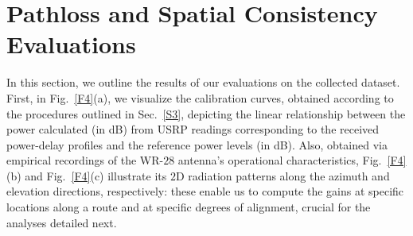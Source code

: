 \documentclass[12pt, draftcls, onecolumn]{IEEEtran}
\begin{document}
\section{Pathloss and Spatial Consistency Evaluations}\label{S4}
In this section, we outline the results of our evaluations on the collected dataset. First, in Fig.~\ref{F4}(a), we visualize the calibration curves, obtained according to the procedures outlined in Sec.~\ref{S3}, depicting the linear relationship between the power calculated (in dB) from USRP readings corresponding to the received power-delay profiles and the reference power levels (in dB). Also, obtained via empirical recordings of the WR-$28$ antenna's operational characteristics, Fig.~\ref{F4}(b) and Fig.~\ref{F4}(c) illustrate its $2$D radiation patterns along the azimuth and elevation directions, respectively: these enable us to compute the gains at specific locations along a route and at specific degrees of alignment, crucial for the analyses detailed next.
\end{document}
